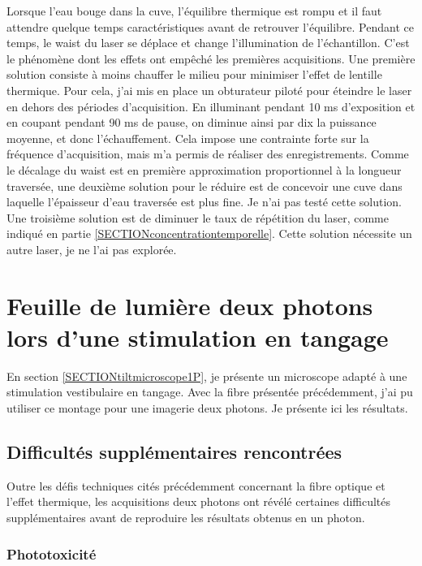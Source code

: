 Lorsque l'eau bouge dans la cuve, l'équilibre thermique est rompu et il faut attendre quelque temps caractéristiques avant de retrouver l'équilibre. Pendant ce temps, le waist du laser se déplace et change l'illumination de l'échantillon. C'est le phénomène dont les effets ont empêché les premières acquisitions. Une première solution consiste à moins chauffer le milieu pour minimiser l'effet de lentille thermique. Pour cela, j'ai mis en place un obturateur piloté pour éteindre le laser en dehors des périodes d'acquisition. En illuminant pendant 10 ms d'exposition et en coupant pendant 90 ms de pause, on diminue ainsi par dix la puissance moyenne, et donc l'échauffement. Cela impose une contrainte forte sur la fréquence d'acquisition, mais m'a permis de réaliser des enregistrements.
Comme le décalage du waist est en première approximation proportionnel à la longueur traversée, une deuxième solution pour le réduire est de concevoir une cuve dans laquelle l'épaisseur d'eau traversée est plus fine. Je n'ai pas testé cette solution.
Une troisième solution est de diminuer le taux de répétition du laser, comme indiqué en partie \ref{SECTIONconcentrationtemporelle}. Cette solution nécessite un autre laser, je ne l'ai pas explorée.


\section[Tangage deux photons]{Feuille de lumière deux photons lors d'une stimulation en tangage}

En section \ref{SECTIONtiltmicroscope1P}, je présente un microscope adapté à une stimulation vestibulaire en tangage. Avec la fibre présentée précédemment, j'ai pu utiliser ce montage pour une imagerie deux photons. Je présente ici les résultats.

\subsection{Difficultés supplémentaires rencontrées}

Outre les défis techniques cités précédemment concernant la fibre optique et l'effet thermique, les acquisitions deux photons ont révélé certaines difficultés supplémentaires avant de reproduire les résultats obtenus en un photon.

\subsubsection{Phototoxicité}


